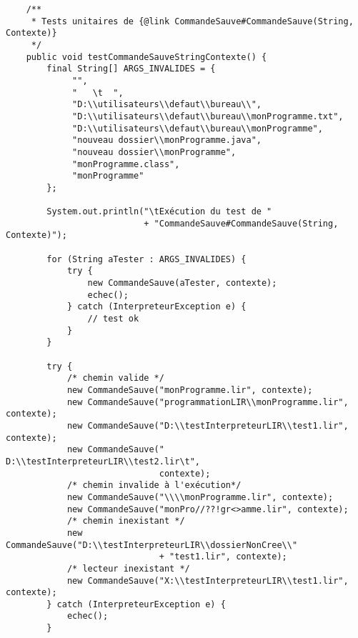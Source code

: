 \begin{enum}
\begin{verbatim}
    /**
     * Tests unitaires de {@link CommandeSauve#CommandeSauve(String, Contexte)}
     */
    public void testCommandeSauveStringContexte() {
        final String[] ARGS_INVALIDES = {
             "",
             "   \t  ",
             "D:\\utilisateurs\\defaut\\bureau\\",
             "D:\\utilisateurs\\defaut\\bureau\\monProgramme.txt",
             "D:\\utilisateurs\\defaut\\bureau\\monProgramme",
             "nouveau dossier\\monProgramme.java",
             "nouveau dossier\\monProgramme",
             "monProgramme.class",
             "monProgramme"
        };
        
        System.out.println("\tExécution du test de "
                           + "CommandeSauve#CommandeSauve(String, Contexte)");
        
        for (String aTester : ARGS_INVALIDES) {
            try {
                new CommandeSauve(aTester, contexte);
                echec();
            } catch (InterpreteurException e) {
                // test ok
            }
        }
        
        try {
            /* chemin valide */
            new CommandeSauve("monProgramme.lir", contexte);
            new CommandeSauve("programmationLIR\\monProgramme.lir", contexte);
            new CommandeSauve("D:\\testInterpreteurLIR\\test1.lir", contexte);
            new CommandeSauve("  D:\\testInterpreteurLIR\\test2.lir\t",
                              contexte);
            /* chemin invalide à l'exécution*/
            new CommandeSauve("\\\\monProgramme.lir", contexte);
            new CommandeSauve("monPro//??!gr<>amme.lir", contexte);
            /* chemin inexistant */
            new CommandeSauve("D:\\testInterpreteurLIR\\dossierNonCree\\"
                              + "test1.lir", contexte);
            /* lecteur inexistant */
            new CommandeSauve("X:\\testInterpreteurLIR\\test1.lir", contexte);
        } catch (InterpreteurException e) {
            echec();
        }
        

\end{verbatim}
\end{enum}
